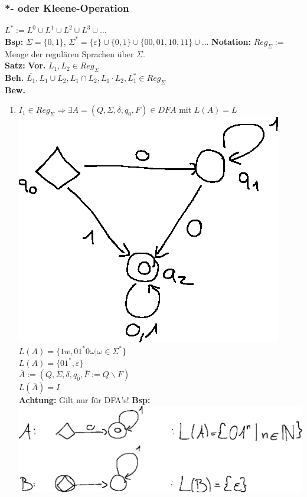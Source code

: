 \documentclass[10pt]{article}
\newcommand{\Bold}[1]{\textbf{#1}} %
\newcommand{\Ra}{\Rightarrow}
\begin{document}
\subsubsection{*- oder Kleene-Operation}
$L^*:=L^0\cup L^1\cup L^2\cup L^3\cup\dots$\\
\Bold{Bsp:} $\Sigma=\{0,1\}$, $\Sigma^*=\{\varepsilon\}\cup\{0,1\}\cup\{00,01,10,11\}\cup\dots$
\Bold{Notation:} $Reg_\Sigma:=$ Menge der regul\"aren Sprachen \"uber $\Sigma$.\\
\Bold{Satz:} \Bold{Vor.} $L_1,L_2\in Reg_\Sigma$\\
\Bold{Beh.} $\overline{L_1},L_1\cup L_2,L_1\cap L_2,L_1\cdot L_2,L_1^*\in Reg_\Sigma$\\[\baselineskip]
\Bold{Bew.}
\begin{enumerate}
 \item $I_1\in Reg_\Sigma\Ra\exists A=(Q,\Sigma,\delta,q_0,F)\in DFA$ mit $L(A)=L$\\
\includegraphics{Bild10.eps}\\
 $L(A)=\{1w,01^*0\omega|\omega\in\Sigma^*\}$\\
 $\overline{L(A)}=\{01^*,\varepsilon\}$\\
 $\overline{A}:=(Q,\Sigma,\delta,q_0,\overline{F}:=Q\backslash F)$\\
 $L(\overline{A})=I$\\
 \Bold{Achtung:} Gilt nur f\"ur DFA's!
 \Bold{Bsp:}\\
\includegraphics{Bild12.eps}\\

\end{enumerate}
\end{document}
